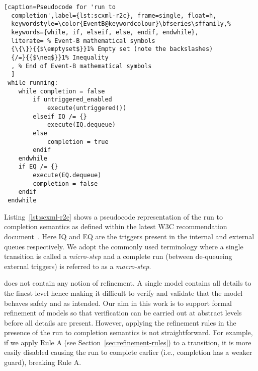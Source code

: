 \begin{lstlisting}[caption=Pseudocode for 'run to
  completion',label={lst:scxml-r2c}, frame=single, float=h,
  keywordstyle=\color{EventB@keywordcolour}\bfseries\sffamily,%
  keywords={while, if, elseif, else, endif, endwhile},
  literate= % Event-B mathematical symbols
  {\{\}}{{$\emptyset$}}1% Empty set (note the backslashes)
  {/=}{{$\neq$}}1% Inequality
  , % End of Event-B mathematical symbols
  ]
 while running:
 	while completion = false
 		if untriggered_enabled
 			execute(untriggered())
 		elseif IQ /= {}
 			execute(IQ.dequeue)
 		else
 			completion = true
 		endif
 	endwhile
 	if EQ /= {}
 		execute(EQ.dequeue) 
 		completion = false
 	endif
 endwhile 
\end{lstlisting}

Listing~\ref{lst:scxml-r2c} shows a pseudocode representation of the run to completion semantics as defined within the latest W3C recommendation document~\cite{scxmlwebsite}. Here IQ and EQ are the triggers present in the internal and external queues respectively. We adopt the commonly used terminology where a single transition is called a \emph{micro-step} and a complete run (between de-queueing external triggers) is referred to as a \emph{macro-step}.

\SCXML does not contain any notion of refinement. 
A single model contains all details to the finest level hence making it difficult to verify and validate that the model behaves safely and as intended.
Our aim in this work is to support formal refinement of \SCXML models so that verification can be carried out at abstract levels before all details are present.
However, applying the refinement rules in the presence of the run to completion semantics is not straightforward.
For example, if we apply Rule A (see Section~\ref{sec:refinement-rules}) to a transition, it is more easily disabled causing the run to complete earlier (i.e., completion has a weaker guard), breaking Rule A.


